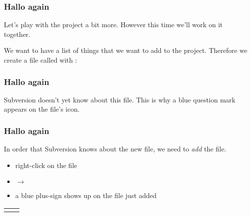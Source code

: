 \begin{frame}[fragile]
    \frametitle{Hallo again}
    Let's play with the  project a bit more.  However this
    time we'll work on it together.

    We want to have a list of things that we want to add to the 
    project.  Therefore we create a file called  with \notepad:

    \begin{center}
    \end{center}
\end{frame}

\begin{frame}[fragile]
    \frametitle{Hallo again}
    Subversion doesn't yet know about this file.  This is why a blue
    question mark appears on the file's icon.

    \begin{center}
    \end{center}
\end{frame}

\begin{frame}[fragile]
    \frametitle{Hallo again}

    In order that Subversion knows about the new file, we need to \emph{add} the
    file.
    \begin{itemize}
        \item right-click on the file
        \item {} $\rightarrow$ 
        \item a blue plus-sign shows up on the file just added
    \end{itemize}

    \begin{center}
        \begin{tabularx}{\textwidth}{cX}
            &
        \end{tabularx}
    \end{center}
\end{frame}

